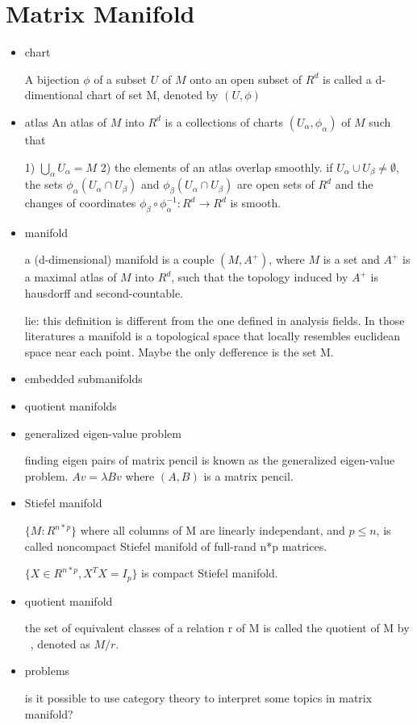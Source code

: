 \documentclass[10pt,a4paper]{book}
\begin{document}
\section {Matrix Manifold}
\begin{itemize}
	\item chart
	
	A bijection $\phi$ of a subset $U$ of $M$ onto an open subset of $R^d$ is called a d-dimentional chart of set M, denoted by  $(U, \phi)$
	
	\item {atlas}
	An atlas of $M$ into $R^d$ is a collections of charts $(U_{\alpha}, \phi_{\alpha })$ of $M$ such that 
	
	1) $\bigcup_{\alpha}U_{\alpha} = M$
	2) the elements of an atlas overlap smoothly. if $U_{\alpha} \cup U_{\beta}  \neq \emptyset$, the sets $\phi_{\alpha}(U_{\alpha} \cap U_{\beta})$ and  $\phi_{\beta}(U_{\alpha} \cap U_{\beta})$ are open sets of $R^d$ and the changes of coordinates $\phi_{\beta} \circ \phi_{\alpha}^{-1} : R^d \to R^d $ is smooth.
	
	\item {manifold}
	
	a (d-dimensional) manifold is a couple $(M, A^+)$, where $M$ is a set and $A^+$ is a maximal atlas of $M$ into $R^d$, such that the topology induced by $A^+$ is hausdorff and second-countable.
	
	lie: this definition is different from the one defined in analysis fields. In those literatures a manifold is a topological space that locally resembles euclidean space near each point. Maybe the only defference is the set M.
	
	
	\item embedded submanifolds
	\item quotient manifolds
	\item generalized eigen-value problem
	
	
	finding eigen pairs of matrix pencil is known as the generalized eigen-value problem. $Av = \lambda B v$ where $(A,B)$ is a matrix pencil.
	
	\item {Stiefel manifold}
	
	$\{M:R^{n*p}\}$ where all columns of M are linearly independant, and $p \leq n$, is called noncompact Stiefel manifold of full-rand n*p matrices.
	
	
	$\{X \in R^{n*p}, X^T X = I_p\}$ is compact Stiefel manifold. 
	
	
	\item {quotient manifold}
	
	the set of equivalent classes of a relation r of M is called the quotient of M by ~, denoted as $M/r$. 
	
	\item {problems}
	
	is it possible to use category theory to interpret some topics in matrix manifold?
	
\end{itemize}
	
\end{document}

